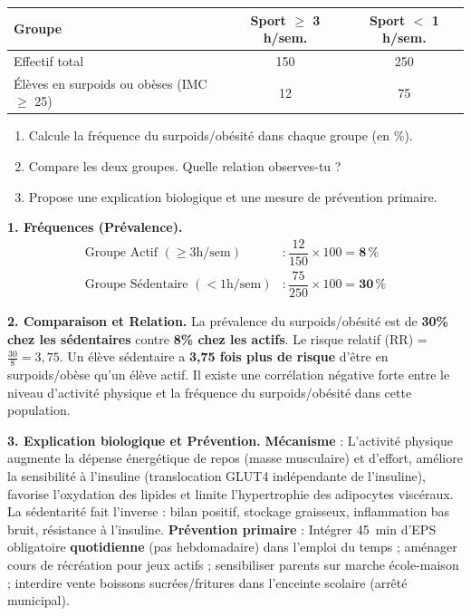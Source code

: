 \documentclass[11pt]{article}
\newcommand{\cle}[1]{{\popxbold\color{popdark}#1}}
\begin{document}
\begin{exoresolu}
\begin{center}
\begin{tabular}{|l|c|c|}\hline
\rowcolor{popblueL} \textbf{Groupe} & \textbf{Sport $\ge$ 3 h/sem.} & \textbf{Sport $<$ 1 h/sem.} \\ \hline
Effectif total & 150 & 250 \\ \hline
Élèves en surpoids ou obèses (IMC $\ge$ 25) & 12 & 75 \\ \hline
\end{tabular}
\end{center}
\begin{enumerate}
\item Calcule la fréquence du surpoids/obésité dans chaque groupe (en \%). 
\item Compare les deux groupes. Quelle relation observes-tu ?
\item Propose une explication biologique et une mesure de prévention primaire.
\end{enumerate}
\tcblower
\textbf{1. Fréquences (Prévalence).}
\begin{align*}
\text{Groupe Actif } (\ge 3\text{h/sem}) &: \dfrac{12}{150} \times 100 = \mathbf{8\,\%} \\
\text{Groupe Sédentaire } (< 1\text{h/sem}) &: \dfrac{75}{250} \times 100 = \mathbf{30\,\%}
\end{align*}

\textbf{2. Comparaison et Relation.}
La prévalence du surpoids/obésité est de \textbf{30\% chez les sédentaires} contre \textbf{8\% chez les actifs}.
Le risque relatif (RR) = $\frac{30}{8} = 3,75$. Un élève sédentaire a \textbf{3,75 fois plus de risque} d'être en surpoids/obèse qu'un élève actif.
Il existe une \cle{corrélation négative forte} entre le niveau d'activité physique et la fréquence du surpoids/obésité dans cette population.

\textbf{3. Explication biologique et Prévention.}
\textbf{Mécanisme} : L'activité physique augmente la dépense énergétique de repos (masse musculaire) et d'effort, améliore la sensibilité à l'insuline (translocation GLUT4 indépendante de l'insuline), favorise l'oxydation des lipides et limite l'hypertrophie des adipocytes viscéraux. La sédentarité fait l'inverse : bilan positif, stockage graisseux, inflammation bas bruit, résistance à l'insuline.
\textbf{Prévention primaire} : Intégrer \SI{45}{min} d'EPS obligatoire \textbf{quotidienne} (pas hebdomadaire) dans l'emploi du temps ; aménager cours de récréation pour jeux actifs ; sensibiliser parents sur marche école-maison ; interdire vente boissons sucrées/fritures dans l'enceinte scolaire (arrêté municipal).
\end{exoresolu}
\end{document}
